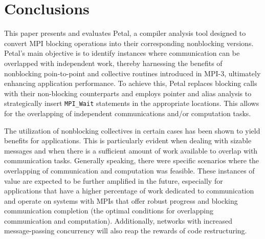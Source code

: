 \section{Conclusions}

This paper presents and evaluates Petal, a compiler analysis tool designed to convert MPI blocking operations into their corresponding nonblocking versions. 
Petal's main objective is to identify instances where communication can be overlapped with independent work, thereby harnessing the benefits of nonblocking poin-to-point and collective routines introduced in MPI-3, ultimately enhancing application performance. 
To achieve this, Petal replaces blocking calls with their non-blocking counterparts and employs pointer and alias analysis to strategically insert \texttt{MPI\_Wait} statements in the appropriate locations. 
This allows for the overlapping of independent communications and/or computation tasks. 

The utilization of nonblocking collectives in certain cases has been shown to yield benefits for applications. 
This is particularly evident when dealing with sizable messages and when there is a sufficient amount of work available to overlap with communication tasks. 
Generally speaking, there were specific scenarios where the overlapping of communication and computation was feasible. 
These instances of value are expected to be further amplified in the future, especially for applications that have a higher percentage of work dedicated to communication and operate on systems with MPIs that offer robust progress and blocking communication completion (the optimal conditions for overlapping communication and computation).
Additionally, networks with increased message-passing concurrency will also reap the rewards of code restructuring.
